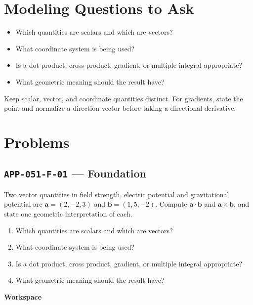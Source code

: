 \documentclass[11pt]{book}
\newcommand{\pid}[1]{\texttt{#1}}
\newcommand{\workspace}{\par\vspace{0.7in}\hrulefill\par\vspace{0.55in}\hrulefill\par}
\begin{document}
\section*{Modeling Questions to Ask}\begin{itemize}
\item Which quantities are scalars and which are vectors?
\item What coordinate system is being used?
\item Is a dot product, cross product, gradient, or multiple integral appropriate?
\item What geometric meaning should the result have?
\end{itemize}
\begin{errorbox}Keep scalar, vector, and coordinate quantities distinct. For gradients, state the point and normalize a direction vector before taking a directional derivative.\end{errorbox}
\section*{Problems}
\subsection*{\pid{APP-051-F-01} — Foundation}
\begin{problembox}
Two vector quantities in field strength, electric potential and gravitational potential are $\mathbf a=(2,-2,3)$ and $\mathbf b=(1,5,-2)$. Compute $\mathbf a\cdot\mathbf b$ and $\mathbf a\times\mathbf b$, and state one geometric interpretation of each.
\end{problembox}
\begin{promptbox}\begin{enumerate}
\item Which quantities are scalars and which are vectors?
\item What coordinate system is being used?
\item Is a dot product, cross product, gradient, or multiple integral appropriate?
\item What geometric meaning should the result have?
\end{enumerate}\end{promptbox}
\textbf{Workspace}\workspace
{}
\end{document}
